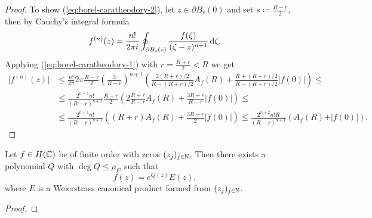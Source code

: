 \begin{proof}
    To show (\ref{eq:borel-caratheodory-2}), let $z \in \partial B_r(0)$ and set $s \coloneqq \frac{R - r}{2}$, then by Cauchy's integral formula
    \begin{equation*}
        f^{(n)}(z) = \frac{n!}{2 \pi i} \oint_{\partial B_s(z)} \frac{f(\zeta)}{(\zeta - z)^{n+1}} \mathop{}\!\mathrm{d} \zeta.
    \end{equation*}
    Applying (\ref{eq:borel-caratheodory-1}) with $r = \frac{R + r}{2} < R$ we get
    \begin{align*}
        \vert f^{(n)}(z) \vert &\leq \frac{n!}{2 \pi} 2 \pi \frac{R - r}{2} \left( \frac{2}{R - r} \right)^{n+1} \left( \frac{2 (R + r)/2}{R - (R+r)/2} A_f(R) + \frac{R + (R + r)/2}{R - (R + r)/2} \vert f(0) \vert \right) \leq \\
        &\leq \frac{2^{n+1} n!}{(R - r)^{n+1}} \frac{R - r}{2} \left( 2 \frac{R+r}{R-r} A_f(R) + \frac{3R + r}{R - r} \vert f(0) \vert \right) \leq \\
        &\leq \frac{2^{n+1} n!}{(R - r)^{n+1}} \left( (R+r) A_f(R) + \frac{3R + r}{2} \vert f(0) \vert \right) \leq \frac{2^{n+2} n! R}{(R - r)^{n+1}} (A_f(R) + \vert f(0) \vert).
    \end{align*}
\end{proof}

\begin{theorem}[Hadamard] \label{thm:hadamard}
    Let $f \in H(\mathbb{C})$ be of finite order with zeros $(z_j)_{j \in \mathbb{N}}$. Then there exists a polynomial $Q$ with $\deg Q \leq \rho_f$, such that
    $$ f(z) = e^{Q(z)} E(z), $$
    where $E$ is a Weierstrass canonical product formed from $(z_j)_{j \in \mathbb{N}}$.
\end{theorem}

\begin{proof}
\end{proof}